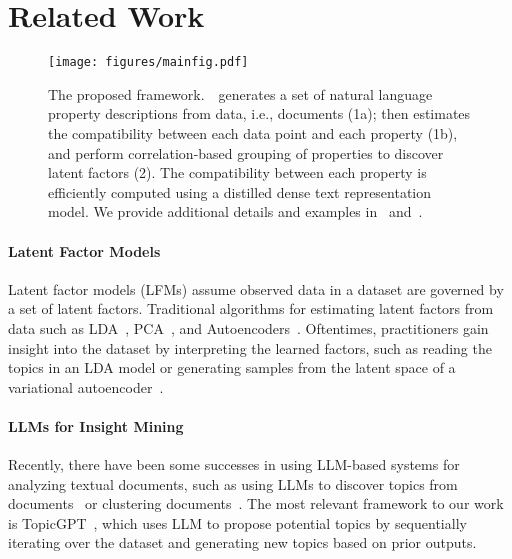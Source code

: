 \section{Related Work}
\begin{figure*}[tb]
\centering
\texttt{[image: figures/mainfig.pdf]}
\caption{The proposed framework.~\ourmethod~generates a set of natural language property descriptions from data, i.e., documents (1a); then estimates the compatibility between each data point and each property (1b), and perform correlation-based grouping of properties to discover latent factors (2). The compatibility between each property is efficiently computed using a distilled dense text representation model. We provide additional details and examples in~ and~.
}
\label{fig:our_framework}
\vspace{-2mm}
\end{figure*}




\paragraph{Latent Factor Models}
Latent factor models (LFMs) assume observed data in a dataset are governed by a set of latent factors. 
Traditional algorithms for estimating latent factors from data such as LDA~\cite{Blei2009LatentDA}, PCA~\cite{Jolliffe2016PrincipalCA}, and Autoencoders~\cite{Rumelhart1986LearningIR}. 
Oftentimes, practitioners gain insight into the dataset by interpreting the learned factors, such as reading the topics in an LDA model or generating samples from the latent space of a variational autoencoder~\cite{Kingma2013AutoEncodingVB}.


\paragraph{LLMs for Insight Mining}
Recently, there have been some successes in using LLM-based systems for analyzing textual documents, such as using LLMs to discover topics from documents~\cite{pham-etal-2024-topicgpt} or clustering documents~\cite{wang-etal-2023-goal}.
The most relevant framework to our work is TopicGPT~\cite{pham-etal-2024-topicgpt}, which uses LLM to propose potential topics by sequentially iterating over the dataset and generating new topics based on prior outputs.


